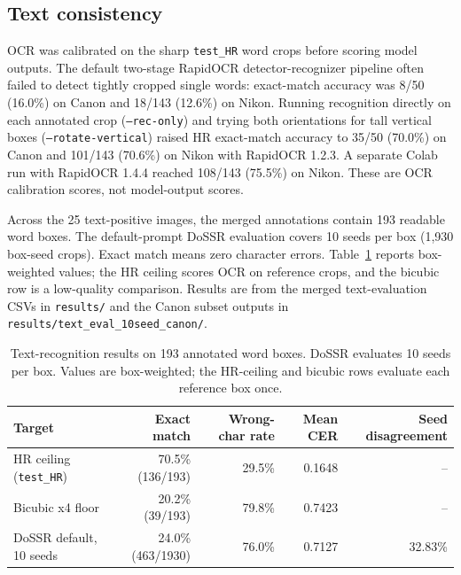 \documentclass[11pt]{article}
\begin{document}
\subsection{Text consistency}
OCR was calibrated on the sharp \texttt{test\_HR} word crops before scoring model outputs. The default two-stage RapidOCR detector-recognizer pipeline often failed to detect tightly cropped single words: exact-match accuracy was 8/50 (16.0\%) on Canon and 18/143 (12.6\%) on Nikon. Running recognition directly on each annotated crop (\texttt{--rec-only}) and trying both orientations for tall vertical boxes (\texttt{--rotate-vertical}) raised HR exact-match accuracy to 35/50 (70.0\%) on Canon and 101/143 (70.6\%) on Nikon with RapidOCR 1.2.3. A separate Colab run with RapidOCR 1.4.4 reached 108/143 (75.5\%) on Nikon. These are OCR calibration scores, not model-output scores.

Across the 25 text-positive images, the merged annotations contain 193 readable word boxes. The default-prompt DoSSR evaluation covers 10 seeds per box (1,930 box-seed crops). Exact match means zero character errors. Table~\ref{tab:text-results} reports box-weighted values; the HR ceiling scores OCR on reference crops, and the bicubic row is a low-quality comparison. Results are from the merged text-evaluation CSVs in \texttt{results/} and the Canon subset outputs in \texttt{results/text\_eval\_10seed\_canon/}.

\begin{table}[ht]
\centering
\footnotesize
\caption{Text-recognition results on 193 annotated word boxes. DoSSR evaluates 10 seeds per box. Values are box-weighted; the HR-ceiling and bicubic rows evaluate each reference box once.}
\label{tab:text-results}
\begin{tabularx}{\linewidth}{Xrrrr}
\toprule
Target & Exact match & Wrong-char rate & Mean CER & Seed disagreement \\
\midrule
HR ceiling (\texttt{test\_HR}) & 70.5\% (136/193) & 29.5\% & 0.1648 & -- \\
Bicubic x4 floor & 20.2\% (39/193) & 79.8\% & 0.7423 & -- \\
DoSSR default, 10 seeds & 24.0\% (463/1930) & 76.0\% & 0.7127 & 32.83\% \\
\bottomrule
\end{tabularx}
\end{table}
\end{document}
